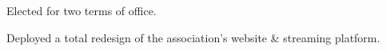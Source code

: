 \documentclass[]{deedy-resume-openfont}
\begin{document}
\begin{minipage}[t]{0.66\textwidth}
\begin{tightemize}
\item Elected for two terms of office.
\item Deployed a total redesign of the association's website \& streaming platform.
\end{tightemize}
\sectionsep

\end{minipage} 
\end{document}
